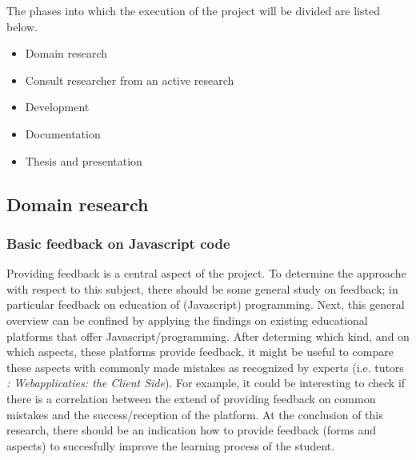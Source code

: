 \documentclass{article}
\begin{document}
The phases into which the execution of the project will be divided are listed 
below. 

\begin{itemize} \item Domain research \item Consult researcher from an active 
research \item Development \item Documentation \item Thesis and presentation 
\end{itemize} 


\subsection{Domain research}

\subsubsection{Basic feedback on Javascript code
} Providing feedback is a central aspect of the project. To determine the 
approache with respect to this subject, there should be some general study on 
feedback; in particular feedback on education of (Javascript) programming. Next, 
this general overview can be confined by applying the findings on existing 
educational platforms that offer Javascript/programming. After determing which 
kind, and on which aspects, these platforms provide feedback, it might be useful 
to compare these aspects with commonly made mistakes as recognized by experts 
(i.e. tutors {\em: Webapplicaties: the Client Side}). For example, it could be 
interesting to check if there is a correlation between the extend of providing 
feedback on common mistakes and the success/reception of the platform. At the 
conclusion of this research, there should be an indication how to provide 
feedback (forms and aspects) to succesfully improve the learning process of the 
student. 

\end{document}
